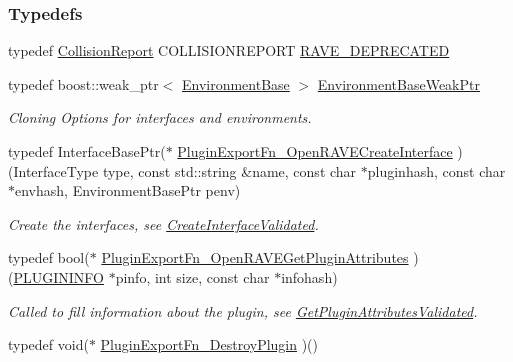 \subsubsection*{Typedefs}
\begin{DoxyCompactItemize}
\item 
typedef \hyperlink{classOpenRAVE_1_1CollisionReport}{CollisionReport} COLLISIONREPORT \hyperlink{namespaceOpenRAVE_af23fc4c2c72950a8c02f38ef71680bc6}{RAVE\_\-DEPRECATED}
\item 
\hypertarget{namespaceOpenRAVE_a07792c5083a23c50672e928bd20a026f}{
typedef boost::weak\_\-ptr$<$ \hyperlink{classOpenRAVE_1_1EnvironmentBase}{EnvironmentBase} $>$ \hyperlink{namespaceOpenRAVE_a07792c5083a23c50672e928bd20a026f}{EnvironmentBaseWeakPtr}}
\label{namespaceOpenRAVE_a07792c5083a23c50672e928bd20a026f}

\begin{DoxyCompactList}\small\item\em Cloning Options for interfaces and environments. \item\end{DoxyCompactList}\item 
\hypertarget{group__plugin__exports_ga6ae2f1554f547f27e4a5399d8aef7377}{
typedef InterfaceBasePtr($\ast$ \hyperlink{group__plugin__exports_ga6ae2f1554f547f27e4a5399d8aef7377}{PluginExportFn\_\-OpenRAVECreateInterface} )(InterfaceType type, const std::string \&name, const char $\ast$pluginhash, const char $\ast$envhash, EnvironmentBasePtr penv)}
\label{group__plugin__exports_ga6ae2f1554f547f27e4a5399d8aef7377}

\begin{DoxyCompactList}\small\item\em Create the interfaces, see \hyperlink{group__plugin__exports_ga468c900067e08689383b3f8da642141f}{CreateInterfaceValidated}. \item\end{DoxyCompactList}\item 
\hypertarget{group__plugin__exports_ga7cb4e2769bee1dca182b4432a900bc70}{
typedef bool($\ast$ \hyperlink{group__plugin__exports_ga7cb4e2769bee1dca182b4432a900bc70}{PluginExportFn\_\-OpenRAVEGetPluginAttributes} )(\hyperlink{classOpenRAVE_1_1PLUGININFO}{PLUGININFO} $\ast$pinfo, int size, const char $\ast$infohash)}
\label{group__plugin__exports_ga7cb4e2769bee1dca182b4432a900bc70}

\begin{DoxyCompactList}\small\item\em Called to fill information about the plugin, see \hyperlink{group__plugin__exports_gaf90c03438b94cc76e7b8a54d445ec106}{GetPluginAttributesValidated}. \item\end{DoxyCompactList}\item 
\hypertarget{group__plugin__exports_ga7164d2e9a268c6e44a296e9488df69cd}{
typedef void($\ast$ \hyperlink{group__plugin__exports_ga7164d2e9a268c6e44a296e9488df69cd}{PluginExportFn\_\-DestroyPlugin} )()}
\label{group__plugin__exports_ga7164d2e9a268c6e44a296e9488df69cd}


\end{DoxyCompactItemize}
